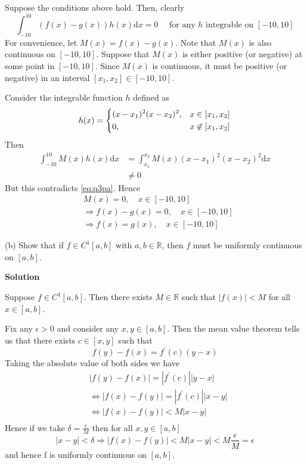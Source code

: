 \documentclass{article}
\begin{document}
Suppose the conditions above hold. Then, clearly
%
\begin{equation}
    \int_{-10}^{10} \left(f(x) - g(x)\right) h(x) \mathrm{d} x = 0
    \quad \text { for any } h \text { integrable on } [-10, 10]
    \label{eq:q3pa}
\end{equation}
%
For convenience, let $M(x) = f(x) - g(x)$. Note that $M(x)$ is also
continuous on $[-10, 10]$. Suppose that $M(x)$ is either positive (or
negative) at some point in $[-10, 10]$. Since $M(x)$ is continuous, it
must be positive (or negative) in an interval $[x_1, x_2] \in [-10, 10]$.

Consider the integrable function $h$ defined as
%
\begin{equation*}
    h(x) =
        \begin{dcases}
            (x - x_1)^2 (x - x_2)^2, & x \in [x_1, x_2] \\
            0, & x \not\in [x_1, x_2]
        \end{dcases}
\end{equation*}
%
Then
%
\begin{align*}
    \int_{-10}^{10} M(x) h(x) \mathrm{d} x
        &= \int_{x_1}^{x_2} M(x) (x - x_1)^2 (x - x_2)^2 \mathrm{d} x \\
        &\neq 0
\end{align*}
%
But this contradicts \eqref{eq:q3pa}. Hence
%
\begin{align*}
    &M(x) = 0, \quad x \in [-10, 10] \\
    &\Rightarrow f(x) - g(x) = 0, \quad x \in [-10, 10] \\
    &\Rightarrow f(x) = g(x), \quad x \in [-10, 10]
\end{align*}

\vspace{5mm}

(b) Show that if $f \in C^{1}[a, b]$ with $a, b \in \mathbb{R}$, then
$f$ must be uniformly continuous on $[a, b]$.

\textbf{Solution}

Suppose $f \in C^1[a, b]$. Then there exists $M \in \mathbb{R}$ such
that $|f(x)| < M$ for all $x \in [a, b]$.

Fix any $\epsilon > 0$ and consider any $x, y \in [a, b]$. Then the mean
value theorem tells us that there exists $c \in [x, y]$ such that
%
\begin{equation*}
    f(y) - f(x) = f^\prime(c) (y - x)
\end{equation*}
%
Taking the absolute value of both sides we have
%
\begin{align*}
    &|f(y) - f(x)| = |f^\prime(c)| |y - x| \\
    &\iff |f(x) - f(y)| = |f^\prime(c)| |x - y| \\
    &\iff |f(x) - f(y)| < M |x - y| \\
\end{align*}
%
Hence if we take $\delta = \frac{\epsilon}{M}$ then for all $x, y \in [a, b]$
%
\begin{equation*}
    |x - y| < \delta
    \Rightarrow |f(x) - f(y)| < M |x - y| < M \frac{\epsilon}{M} = \epsilon
\end{equation*}
%
and hence f is uniformly continuous on $[a, b]$.
\end{document}
